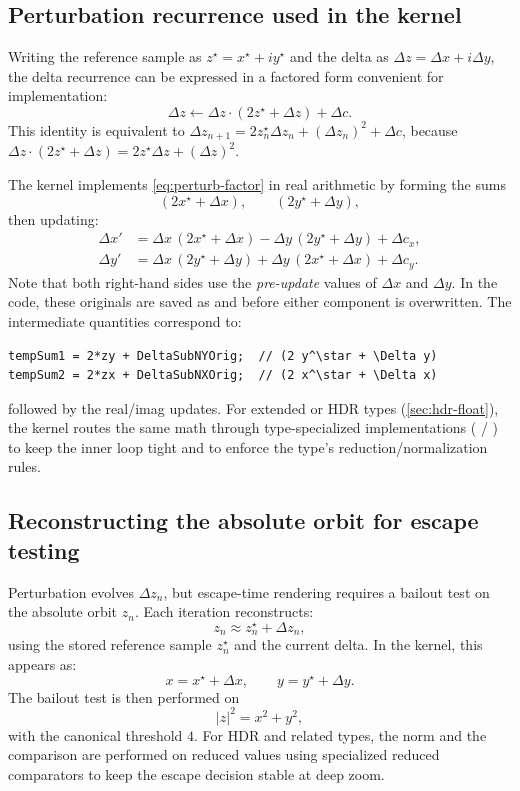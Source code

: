 \subsection{Perturbation recurrence used in the kernel}
\label{sec:perturb-only-update}

Writing the reference sample as \(z^\star = x^\star + i y^\star\) and the delta
as \(\Delta z = \Delta x + i \Delta y\), the delta recurrence can be expressed
in a factored form convenient for implementation:
\begin{equation}
\Delta z \leftarrow \Delta z \cdot (2 z^\star + \Delta z) + \Delta c.
\label{eq:perturb-factor}
\end{equation}
This identity is equivalent to
\(\Delta z_{n+1} = 2 z_n^\star \Delta z_n + (\Delta z_n)^2 + \Delta c\), because
\(\Delta z\cdot(2z^\star+\Delta z) = 2z^\star\Delta z + (\Delta z)^2\).

The kernel implements \cref{eq:perturb-factor} in real arithmetic by forming
the sums
\[
(2x^\star + \Delta x),\qquad (2y^\star + \Delta y),
\]
then updating:
\begin{align}
\Delta x' &= \Delta x\,(2x^\star + \Delta x) - \Delta y\,(2y^\star + \Delta y) + \Delta c_x, \\
\Delta y' &= \Delta x\,(2y^\star + \Delta y) + \Delta y\,(2x^\star + \Delta x) + \Delta c_y.
\end{align}
Note that both right-hand sides use the \emph{pre-update} values of
\(\Delta x\) and \(\Delta y\).  In the code, these originals are saved as
 and  before either component is
overwritten.  The intermediate quantities correspond to:
\begin{lstlisting}
tempSum1 = 2*zy + DeltaSubNYOrig;  // (2 y^\star + \Delta y)
tempSum2 = 2*zx + DeltaSubNXOrig;  // (2 x^\star + \Delta x)
\end{lstlisting}
followed by the real/imag updates. For extended or HDR types (\cref{sec:hdr-float}), the kernel routes
the same math through type-specialized implementations
( / ) to keep the inner loop
tight and to enforce the type's reduction/normalization rules.

\subsection{Reconstructing the absolute orbit for escape testing}
\label{sec:perturb-only-reconstruct}

Perturbation evolves \(\Delta z_n\), but escape-time rendering requires a
bailout test on the absolute orbit \(z_n\). Each iteration reconstructs:
\[
z_n \approx z_n^\star + \Delta z_n,
\]
using the stored reference sample \(z_n^\star\) and the current delta. In the
kernel, this appears as:
\[
x = x^\star + \Delta x,\qquad y = y^\star + \Delta y.
\]
The bailout test is then performed on
\[
|z|^2 = x^2 + y^2,
\]
with the canonical threshold \(4\). For HDR and related types, the norm and the
comparison are performed on reduced values using specialized reduced
comparators to keep the escape decision stable at deep zoom.

